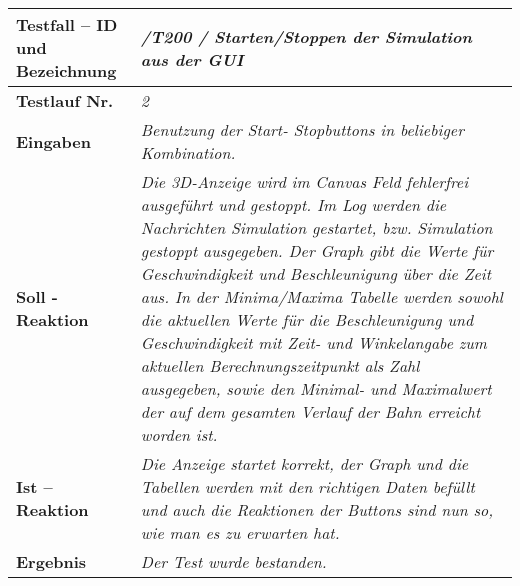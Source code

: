 \begin{longtable}{|p{7cm}|p{10cm}|}
\hline
\textbf{Testfall -- ID und Bezeichnung} & \textit{ /T200 / Starten/Stoppen der Simulation aus der GUI} \\
\hline
\textbf{Testlauf Nr.} & \textit{2} \\
\hline
\textbf{Eingaben} & \textit{Benutzung der Start- Stopbuttons in beliebiger Kombination.} \\
\hline
\textbf{Soll - Reaktion} & \textit{Die 3D-Anzeige wird im Canvas Feld fehlerfrei ausgeführt und gestoppt. Im Log werden die Nachrichten Simulation gestartet, bzw. Simulation gestoppt ausgegeben.
Der Graph gibt die Werte für Geschwindigkeit und Beschleunigung über die Zeit aus. In der Minima/Maxima Tabelle werden sowohl die aktuellen Werte für die Beschleunigung und Geschwindigkeit mit 
Zeit- und Winkelangabe zum aktuellen Berechnungszeitpunkt als Zahl ausgegeben, sowie den Minimal- und Maximalwert der auf dem gesamten Verlauf der Bahn erreicht worden ist.
} \\
\hline
\textbf{Ist -- Reaktion} & \textit{Die Anzeige startet korrekt, der Graph und die Tabellen werden mit den richtigen Daten befüllt und auch die Reaktionen der Buttons sind nun so, wie man es zu
erwarten hat.} \\
\hline
\textbf{Ergebnis} & \textit{Der Test wurde bestanden.} \\
\hline
 \end{longtable}